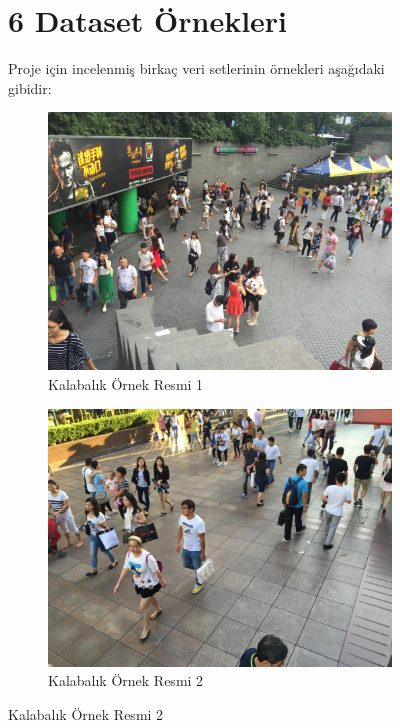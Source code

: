 \documentclass[10pt,a4paper]{report}
\begin{document}
	\begin{figure}[!h]
		\section*{6 Dataset Örnekleri}
		Proje için incelenmiş birkaç veri setlerinin örnekleri aşağıdaki gibidir:
		
		\begin{subfigure}{\textwidth}
			\raggedright
			\includegraphics[width=\textwidth]{ornek1.jpg}
			\caption{Kalabalık Örnek Resmi 1 \cite{shanghaitechdataset} }
			\label{Ornek1}
		\end{subfigure}
		\begin{subfigure}{\textwidth}
			\raggedright
			\includegraphics[width=\textwidth]{ornek2.jpg}
			\caption{Kalabalık Örnek Resmi 2 \cite{shanghaitechdataset}}
			\label{Ornek2}
		\end{subfigure}
	\end{figure}
	
\end{document}
